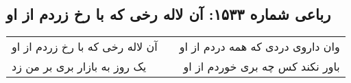 \begin{center}
\section*{رباعی شماره ۱۵۳۳: آن لاله رخی که با رخ زردم از او}
\label{sec:1533}
\begin{longtable}{l p{0.5cm} r}
آن لاله رخی که با رخ زردم از او
&&
وان داروی دردی که همه دردم از او
\\
یک روز به بازار بری بر من زد
&&
باور نکند کس چه بری خوردم از او
\\
\end{longtable}
\end{center}
